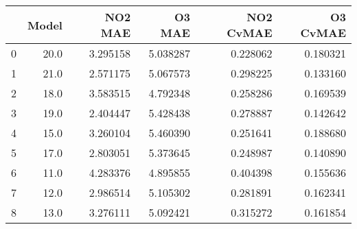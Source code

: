 \begin{tabular}{lrrrrr}
\toprule
{} &  Model &   NO2 MAE &    O3 MAE &  NO2 CvMAE &  O3 CvMAE \\
\midrule
0 &   20.0 &  3.295158 &  5.038287 &   0.228062 &  0.180321 \\
1 &   21.0 &  2.571175 &  5.067573 &   0.298225 &  0.133160 \\
2 &   18.0 &  3.583515 &  4.792348 &   0.258286 &  0.169539 \\
3 &   19.0 &  2.404447 &  5.428438 &   0.278887 &  0.142642 \\
4 &   15.0 &  3.260104 &  5.460390 &   0.251641 &  0.188680 \\
5 &   17.0 &  2.803051 &  5.373645 &   0.248987 &  0.140890 \\
6 &   11.0 &  4.283376 &  4.895855 &   0.404398 &  0.155636 \\
7 &   12.0 &  2.986514 &  5.105302 &   0.281891 &  0.162341 \\
8 &   13.0 &  3.276111 &  5.092421 &   0.315272 &  0.161854 \\
\bottomrule
\end{tabular}

